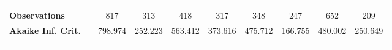 \begin{tabular*}{\linewidth}{@{\extracolsep{\fill} } llcccccccc}
\hline%
\arrayrulecolor{white}%
\hline%
\arrayrulecolor{white}%
\hline%
\arrayrulecolor{white}%
\hline%
\arrayrulecolor{white}%
\hline%
&&&&&&&&&\\%
\bfseries Observations&&817&313&418&317&348&247&652&209\\%
\bfseries Akaike Inf. Crit.&&798.974&252.223&563.412&373.616&475.712&166.755&480.002&250.649\\%
\arrayrulecolor{white}%
\hline%
\arrayrulecolor{white}%
\hline%
\arrayrulecolor{white}%
\hline%
\arrayrulecolor{white}%
\hline%
\arrayrulecolor{white}%
\hline%
&&&&&&&&&\\%
\arrayrulecolor{black}%
\hline%
\end{tabular*}